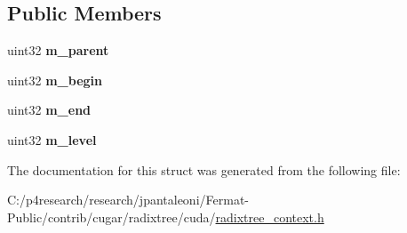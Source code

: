 \subsection*{Public Members}
\begin{DoxyCompactItemize}
\item 
\mbox{\label{structcugar_1_1cuda_1_1_radixtree__context_1_1_split__task_a50b9231e87566b460d10e9d9eaef506a}} 
uint32 {\bfseries m\+\_\+parent}
\item 
\mbox{\label{structcugar_1_1cuda_1_1_radixtree__context_1_1_split__task_a317c8e9d95cafb06be649d2d1c9f3dbf}} 
uint32 {\bfseries m\+\_\+begin}
\item 
\mbox{\label{structcugar_1_1cuda_1_1_radixtree__context_1_1_split__task_af677229a06c4ca15e32f53f72d8cda0b}} 
uint32 {\bfseries m\+\_\+end}
\item 
\mbox{\label{structcugar_1_1cuda_1_1_radixtree__context_1_1_split__task_ad3731562ca5308d0ac089b733719e4d7}} 
uint32 {\bfseries m\+\_\+level}
\end{DoxyCompactItemize}


The documentation for this struct was generated from the following file\+:\begin{DoxyCompactItemize}
\item 
C\+:/p4research/research/jpantaleoni/\+Fermat-\/\+Public/contrib/cugar/radixtree/cuda/\hyperlink{radixtree__context_8h}{radixtree\+\_\+context.\+h}\end{DoxyCompactItemize}
